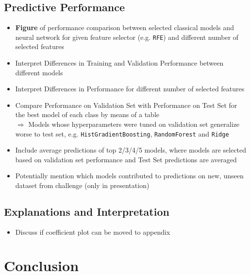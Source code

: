 \documentclass[12pt, letterpaper]{article}
\begin{document}
\subsection{Predictive Performance} %
\begin{itemize}
    \item \textbf{Figure} of performance comparison between selected classical models and neural network for given feature selector (e.g. \texttt{RFE}) and different number of selected features
    \item Interpret Differences in Training and Validation Performance between different models
    \item Interpret Differences in Performance for different number of selected features
    \item Compare Performance on Validation Set with Performance on Test Set for the best model of each class by means of a table \\
          $\Rightarrow$ Models whose hyperparameters were tuned on validation set generalize worse to test set, e.g. \texttt{HistGradientBoosting}, \texttt{RandomForest} and \texttt{Ridge}
    \item Include average predictions of top 2/3/4/5 models, where models are selected based on validation set performance and Test Set predictions are averaged
    \item Potentially mention which models contributed to predictions on new, unseen dataset from challenge (only in presentation)
\end{itemize}


\subsection{Explanations and Interpretation} %

\begin{itemize}
    \item Discuss if coefficient plot can be moved to appendix
\end{itemize}


\section{Conclusion} %
\end{document}
